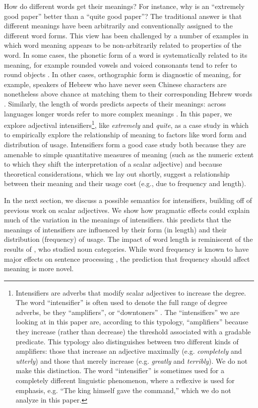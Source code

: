 \documentclass[10pt,letterpaper]{article}
\newcommand{\w}[1]{\emph{#1}}
\begin{document}
How do different words get their meanings?
For instance, why is an ``extremely good paper'' better than a ``quite good paper''? The traditional answer \cite{saussure} is that different meanings have been arbitrarily and conventionally assigned to the different word forms.
This view has been challenged by a number of examples in which word meaning appears to be non-arbitrarily related to properties of the word.
In some cases, the phonetic form of a word is systematically related to its meaning, for example rounded vowels and voiced consonants tend to refer to round objects \cite{maluma-takete, bouba-kiki, bouba-kiki2, takete-uloomo}. 
In other cases, orthographic form is diagnostic of meaning, for example, speakers of Hebrew who have never seen Chinese characters are nonetheless above chance at matching them to their corresponding Hebrew words \cite{koriat}. 
Similarly, the length of words predicts aspects of their meanings: across languages longer words refer to more complex meanings \cite{lewis}.
In this paper, we explore adjectival intensifiers\footnote{Intensifiers are adverbs that modify scalar adjectives to increase the degree. The word ``intensifier'' is often used to denote the full range of degree adverbs, be they ``amplifiers'', or ``downtoners'' \cite{quirk}. The ``intensifiers'' we are looking at in this paper are, according to this typology, ``amplifiers'' because they increase (rather than decrease) the threshold associated with a gradable predicate. This typology also distinguishes between two different kinds of amplifiers: those that increase an adjective maximally (e.g. \w{completely} and \w{utterly}) and those that merely increase (e.g. \w{greatly} and \w{terribly}). We do not make this distinction. The word ``intensifier'' is sometimes used for a completely different linguistic phenomenon, where a reflexive is used for emphasis, e.g. ``The king himself gave the command,'' which we do not analyze in this paper.}, like \w{extremely} and \w{quite},
as a case study in which to empirically explore the relationship of meaning to factors like word form and distribution of usage.
Intensifiers form a good case study both because they are amenable to simple quantitative measures of meaning (such as the numeric extent to which they shift the interpretation of a scalar adjective) and because theoretical considerations, which we lay out shortly, suggest a relationship between their meaning and their usage cost (e.g., due to frequency and length).

In the next section, we discuss a possible semantics for intensifiers, building off of previous work on scalar adjectives. We show how pragmatic effects could explain much of the variation in the meanings of intensifiers. this predicts that the meanings of intensifiers are influenced by their form (in length) and their distribution (frequency) of usage. The impact of word length is reminiscent of the results of , who studied noun categories. While word frequency is known to have major effects on sentence processing \cite[e.g.]{levy}, the prediction that frequency should affect meaning is more novel.
\end{document}
